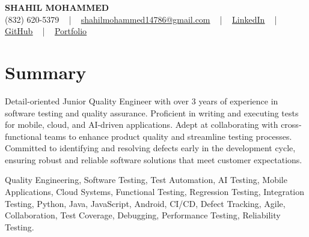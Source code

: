 \documentclass[letterpaper,10pt]{article}
\begin{document}
\begin{center}
    {\fontsize{14pt}{12pt}\selectfont \textbf{\MakeUppercase{Shahil Mohammed}}}\\ \vspace{2pt}
    \fontsize{10pt}{12pt}\selectfont (832) 620-5379 ~ | ~ \href{mailto:shahilmohammed14786@gmail.com}{shahilmohammed14786@gmail.com} ~ | ~  
    \href{https://www.linkedin.com/in/shahil-mohammed-9652931a1/}{\color{blue}\underline{LinkedIn}}  ~ | ~ 
    \href{https://github.com/freakbeast14}{\color{blue}\underline{GitHub}} ~ | ~ 
    \href{https://shahil-mohammed.netlify.app/}{\color{blue}\underline{Portfolio}}
    \vspace{-8pt}
\end{center}

\section{Summary}
\vspace{-2pt}\fontsize{8pt}{9pt}\selectfont
Detail-oriented Junior Quality Engineer with over 3 years of experience in software testing and quality assurance. Proficient in writing and executing tests for mobile, cloud, and AI-driven applications. Adept at collaborating with cross-functional teams to enhance product quality and streamline testing processes. Committed to identifying and resolving defects early in the development cycle, ensuring robust and reliable software solutions that meet customer expectations.
 \vspace{-5pt}
 
{\fontsize{1pt}{1pt}\selectfont\color{white}
Quality Engineering, Software Testing, Test Automation, AI Testing, Mobile Applications, Cloud Systems, Functional Testing, Regression Testing, Integration Testing, Python, Java, JavaScript, Android, CI/CD, Defect Tracking, Agile, Collaboration, Test Coverage, Debugging, Performance Testing, Reliability Testing.
}
\vspace{-8pt}

\vspace{-2pt}
\end{document}
